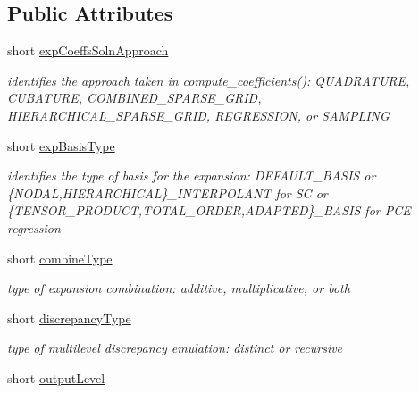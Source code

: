 \subsection*{Public Attributes}
\begin{DoxyCompactItemize}
\item 
short \hyperlink{classPecos_1_1ExpansionConfigOptions_aab384268a7f9d05bb3a53de1dfcf9244}{exp\+Coeffs\+Soln\+Approach}\label{classPecos_1_1ExpansionConfigOptions_aab384268a7f9d05bb3a53de1dfcf9244}

\begin{DoxyCompactList}\small\item\em identifies the approach taken in compute\+\_\+coefficients()\+: Q\+U\+A\+D\+R\+A\+T\+U\+RE, C\+U\+B\+A\+T\+U\+RE, C\+O\+M\+B\+I\+N\+E\+D\+\_\+\+S\+P\+A\+R\+S\+E\+\_\+\+G\+R\+ID, H\+I\+E\+R\+A\+R\+C\+H\+I\+C\+A\+L\+\_\+\+S\+P\+A\+R\+S\+E\+\_\+\+G\+R\+ID, R\+E\+G\+R\+E\+S\+S\+I\+ON, or S\+A\+M\+P\+L\+I\+NG \end{DoxyCompactList}\item 
short \hyperlink{classPecos_1_1ExpansionConfigOptions_a4df6d933ebf73fcf30f55b8cdb5d2b11}{exp\+Basis\+Type}\label{classPecos_1_1ExpansionConfigOptions_a4df6d933ebf73fcf30f55b8cdb5d2b11}

\begin{DoxyCompactList}\small\item\em identifies the type of basis for the expansion\+: D\+E\+F\+A\+U\+L\+T\+\_\+\+B\+A\+S\+IS or \{N\+O\+D\+AL,H\+I\+E\+R\+A\+R\+C\+H\+I\+C\+AL\}\+\_\+\+I\+N\+T\+E\+R\+P\+O\+L\+A\+NT for SC or \{T\+E\+N\+S\+O\+R\+\_\+\+P\+R\+O\+D\+U\+CT,T\+O\+T\+A\+L\+\_\+\+O\+R\+D\+ER,A\+D\+A\+P\+T\+ED\}\+\_\+\+B\+A\+S\+IS for P\+CE regression \end{DoxyCompactList}\item 
short \hyperlink{classPecos_1_1ExpansionConfigOptions_a5f00b865c145833acbf962bab708af39}{combine\+Type}\label{classPecos_1_1ExpansionConfigOptions_a5f00b865c145833acbf962bab708af39}

\begin{DoxyCompactList}\small\item\em type of expansion combination\+: additive, multiplicative, or both \end{DoxyCompactList}\item 
short \hyperlink{classPecos_1_1ExpansionConfigOptions_acba8ffe2ebba12eb6492cea029cc9bf0}{discrepancy\+Type}\label{classPecos_1_1ExpansionConfigOptions_acba8ffe2ebba12eb6492cea029cc9bf0}

\begin{DoxyCompactList}\small\item\em type of multilevel discrepancy emulation\+: distinct or recursive \end{DoxyCompactList}\item 
short \hyperlink{classPecos_1_1ExpansionConfigOptions_a8b080aab3a786ee1439b43c3533f1f6a}{output\+Level}\label{classPecos_1_1ExpansionConfigOptions_a8b080aab3a786ee1439b43c3533f1f6a}


\end{DoxyCompactItemize}
